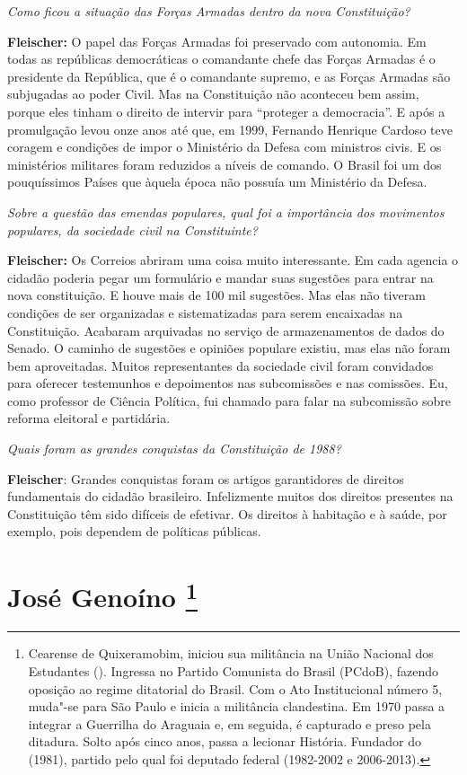 \emph{Como ficou a situação das Forças Armadas dentro da nova
Constituição?}

\textbf{Fleischer:} O papel das Forças Armadas foi preservado com
autonomia. Em todas as repúblicas democráticas o comandante chefe das
Forças Armadas é o presidente da República, que é o comandante supremo,
e as Forças Armadas são subjugadas ao poder Civil. Mas na Constituição
não aconteceu bem assim, porque eles tinham o direito de intervir para
``proteger a democracia''. E após a promulgação levou onze anos até que,
em 1999, Fernando Henrique Cardoso teve coragem e condições de impor o
Ministério da Defesa com ministros civis. E os ministérios militares
foram reduzidos a níveis de comando. O Brasil foi um dos pouquíssimos
Países que àquela época não possuía um Ministério da Defesa.

\emph{Sobre a questão das emendas populares, qual foi a importância
dos movimentos populares, da sociedade civil na Constituinte?}

\textbf{Fleischer:} Os Correios abriram uma coisa muito interessante. Em
cada agencia o cidadão poderia pegar um formulário e mandar suas
sugestões para entrar na nova constituição. E houve mais de 100 mil
sugestões. Mas elas não tiveram condições de ser organizadas e
sistematizadas para serem encaixadas na Constituição. Acabaram
arquivadas no serviço de armazenamentos de dados do Senado. O caminho de
sugestões e opiniões populare existiu, mas elas não foram bem
aproveitadas. Muitos representantes da sociedade civil foram convidados
para oferecer testemunhos e depoimentos nas subcomissões e nas
comissões. Eu, como professor de Ciência Política, fui chamado para
falar na subcomissão sobre reforma eleitoral e partidária.

\emph{Quais foram as grandes conquistas da Constituição de 1988?}

\textbf{Fleischer}: Grandes conquistas foram os artigos garantidores de
direitos fundamentais do cidadão brasileiro. Infelizmente muitos dos
direitos presentes na Constituição têm sido difíceis de efetivar. Os
direitos à habitação e à saúde, por exemplo, pois dependem de políticas
públicas.

\chapter{José Genoíno
\footnote{Cearense de Quixeramobim, iniciou sua militância na União Nacional dos
Estudantes (). Ingressa no Partido Comunista do Brasil (PCdoB),
fazendo oposição ao regime ditatorial do Brasil. Com o Ato Institucional
número 5, muda"-se para São Paulo e inicia a militância clandestina. Em
1970 passa a integrar a Guerrilha do Araguaia e, em seguida, é capturado
e preso pela ditadura. Solto após cinco anos, passa a lecionar História.
Fundador do  (1981), partido pelo qual foi deputado federal (1982-2002
e 2006-2013).}}

